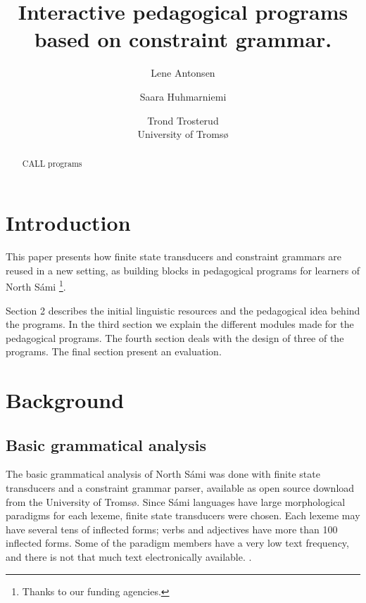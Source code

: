 \documentclass[11pt]{article}
\title{Interactive pedagogical programs based on constraint grammar.}
\author{Lene Antonsen  \and
              Saara Huhmarniemi \and Trond Trosterud \\ University of Tromsø}
\begin{document}


\maketitle
{}
 
\maketitle

\begin{abstract}
CALL programs 
\end{abstract}

\section{Introduction}
This paper presents how finite state transducers and constraint grammars are reused in a new setting, as building blocks in pedagogical programs for learners of North Sámi \footnote{Thanks to our funding agencies.}. %

Section 2 describes the initial linguistic resources and the pedagogical idea behind the programs. In the third section we explain the different modules made for the pedagogical programs. The fourth section deals with the design of three of the programs. The final section present an evaluation.


\section{Background}


\subsection{Basic grammatical analysis}

The basic grammatical analysis of North Sámi was done with finite state transducers and a constraint grammar parser, available as open source download from the University of Tromsø. Since Sámi languages have large morphological paradigms for each lexeme, finite state transducers were chosen. Each lexeme may have several tens of inflected forms; verbs and adjectives have more than 100 inflected forms. Some of the paradigm members have a very low text frequency, and there is not that much text electronically available. \cite{Trosterud:07}.  
\end{document}
